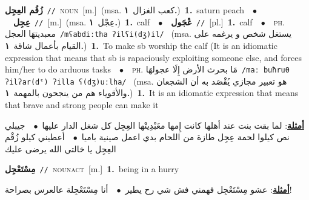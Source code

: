 \documentclass[10pt,a4paper,twoside]{article} %
\begin{document}
\begin{multicols}{2}
{\setlength\topsep{0pt}\textbf{\foreignlanguage{arabic}{زُقُم العِجِل}}\ {\color{gray}\texttt{//}\color{black}}\ \textsc{noun}\ [m.]\ \color{gray}(msa. \foreignlanguage{arabic}{كعب الغزال}~\foreignlanguage{arabic}{\textbf{١.}})\color{black}\ \textbf{1.}~saturn peach\ \ $\bullet$\ \ \setlength\topsep{0pt}\textbf{\foreignlanguage{arabic}{عِجِل}}\ {\color{gray}\texttt{//}\color{black}}\ [m.]\ \color{gray}(msa. \foreignlanguage{arabic}{عِجْل}~\foreignlanguage{arabic}{\textbf{١.}})\color{black}\ \textbf{1.}~calf\ \ $\bullet$\ \ \setlength\topsep{0pt}\textbf{\foreignlanguage{arabic}{عْجَول}}\ {\color{gray}\texttt{//}\color{black}}\ [pl.]\ \textbf{1.}~calf\ \ $\bullet$\ \ \textsc{ph.} \color{gray} \foreignlanguage{arabic}{معبديتهَا العجل}\color{black}\ {\color{gray}\texttt{/{\sffamily mʕabdiːtha ʔilʕi(dʒ)il}/}\color{black}}\ \color{gray} (msa. \foreignlanguage{arabic}{يستغل شخص و يرغمه على القيام بأعمال شاقة}~\foreignlanguage{arabic}{\textbf{١.}})\color{black}\ \textbf{1.}~To make sb worship the calf (It is an idiomatic expression that means that sb is rapaciously exploiting someone else, and forces him/her to do arduous tasks\ \ $\bullet$\ \ \textsc{ph.} \color{gray} \foreignlanguage{arabic}{مَا بحرث الأرض إِلَا عجولهَا}\color{black}\ {\color{gray}\texttt{/{\sffamily maː buħruθ ʔilʔar(dˤ) ʔilla ʕ(dʒ)uːlha}/}\color{black}}\ \color{gray} (msa. \foreignlanguage{arabic}{هو تعبير مجازي يُقْصَد به أن الشجعان والأقوياء هم من ينجحون بالمهمة}~\foreignlanguage{arabic}{\textbf{١.}})\color{black}\ \textbf{1.}~It is an idiomatic expression that means that brave and strong people can make it\  \begin{flushright}\color{gray}\foreignlanguage{arabic}{\textbf{\underline{\foreignlanguage{arabic}{أمثلة}}}: لما بقت بنت عند أهلها كانت إِمها معَبْدِيتْها العِجِل كل شغل الدار عليها\ $\bullet$\ \  جيبلي نص كيلوا لحمة عِجِل طازة من اللحام بدي اعمل صينية باميا\ $\bullet$\ \  أعطيني كيلو زُقْم العِجِل يا خالتي الله يرضى عليك}\end{flushright}\color{black}} \vspace{2mm}

{\setlength\topsep{0pt}\textbf{\foreignlanguage{arabic}{مِسْتَعْجِل}}\ {\color{gray}\texttt{//}\color{black}}\ \textsc{noun\textunderscore act}\ [m.]\ \textbf{1.}~being in a hurry\  \begin{flushright}\color{gray}\foreignlanguage{arabic}{\textbf{\underline{\foreignlanguage{arabic}{أمثلة}}}: عشو مِسْتَعْجِل فهمني فش شي رح يطير\ $\bullet$\ \  أنا مِسْتَعْجِلة عالعرس بصراحة!}\end{flushright}\color{black}} \vspace{2mm}


\end{multicols}
\end{document}
